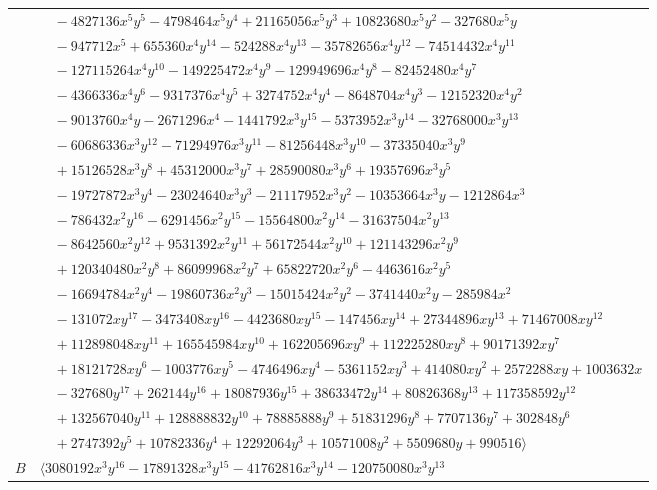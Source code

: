 \documentclass[11pt]{article}
\begin{document}
\begin{longtable}{@{}ll@{}}
 & $\quad -4827136x^{5}y^{5}-4798464x^{5}y^{4}+21165056x^{5}y^{3}+10823680x^{5}y^{2}-327680x^{5}y$\\
 & $\quad -947712x^{5}+655360x^{4}y^{14}-524288x^{4}y^{13}-35782656x^{4}y^{12}-74514432x^{4}y^{11}$\\
 & $\quad -127115264x^{4}y^{10}-149225472x^{4}y^{9}-129949696x^{4}y^{8}-82452480x^{4}y^{7}$\\
 & $\quad -4366336x^{4}y^{6}-9317376x^{4}y^{5}+3274752x^{4}y^{4}-8648704x^{4}y^{3}-12152320x^{4}y^{2}$\\
 & $\quad -9013760x^{4}y-2671296x^{4}-1441792x^{3}y^{15}-5373952x^{3}y^{14}-32768000x^{3}y^{13}$\\
 & $\quad -60686336x^{3}y^{12}-71294976x^{3}y^{11}-81256448x^{3}y^{10}-37335040x^{3}y^{9}$\\
 & $\quad +15126528x^{3}y^{8}+45312000x^{3}y^{7}+28590080x^{3}y^{6}+19357696x^{3}y^{5}$\\
 & $\quad -19727872x^{3}y^{4}-23024640x^{3}y^{3}-21117952x^{3}y^{2}-10353664x^{3}y-1212864x^{3}$\\
 & $\quad -786432x^{2}y^{16}-6291456x^{2}y^{15}-15564800x^{2}y^{14}-31637504x^{2}y^{13}$\\
 & $\quad -8642560x^{2}y^{12}+9531392x^{2}y^{11}+56172544x^{2}y^{10}+121143296x^{2}y^{9}$\\
 & $\quad +120340480x^{2}y^{8}+86099968x^{2}y^{7}+65822720x^{2}y^{6}-4463616x^{2}y^{5}$\\
 & $\quad -16694784x^{2}y^{4}-19860736x^{2}y^{3}-15015424x^{2}y^{2}-3741440x^{2}y-285984x^{2}$\\
 & $\quad -131072xy^{17}-3473408xy^{16}-4423680xy^{15}-147456xy^{14}+27344896xy^{13}+71467008xy^{12}$\\
 & $\quad +112898048xy^{11}+165545984xy^{10}+162205696xy^{9}+112225280xy^{8}+90171392xy^{7}$\\
 & $\quad +18121728xy^{6}-1003776xy^{5}-4746496xy^{4}-5361152xy^{3}+414080xy^{2}+2572288xy+1003632x$\\
 & $\quad -327680y^{17}+262144y^{16}+18087936y^{15}+38633472y^{14}+80826368y^{13}+117358592y^{12}$\\
 & $\quad +132567040y^{11}+128888832y^{10}+78885888y^{9}+51831296y^{8}+7707136y^{7}+302848y^{6}$\\
 & $\quad +2747392y^{5}+10782336y^{4}+12292064y^{3}+10571008y^{2}+5509680y+990516\rangle$\\
$B$ & $\langle 3080192x^{3}y^{16}-17891328x^{3}y^{15}-41762816x^{3}y^{14}-120750080x^{3}y^{13}$\\

\end{longtable}
\end{document}
